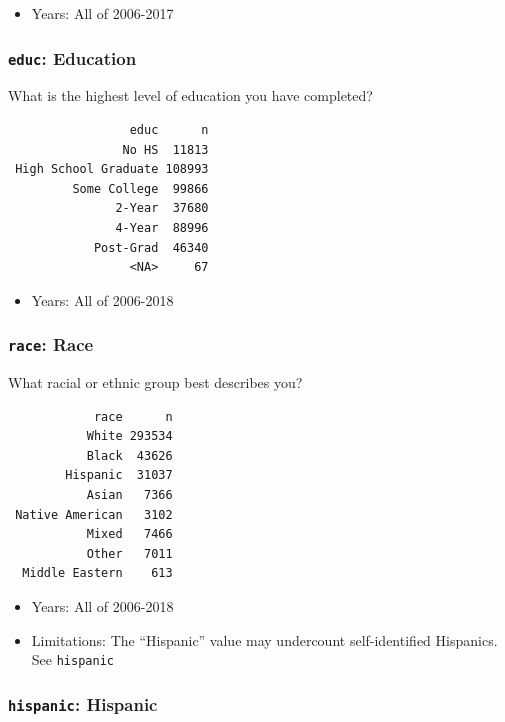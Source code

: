 \documentclass[10pt,article,oneside]{memoir}
\theoremstyle{definition}
\begin{document}
\begin{itemize}
\tightlist
\item
  Years: All of 2006-2017
\end{itemize}

\hypertarget{educ-education}{%
\subsubsection{\texorpdfstring{\texttt{educ}:
Education}{educ: Education}}\label{educ-education}}

What is the highest level of education you have completed?

\begin{verbatim}
                 educ      n
                No HS  11813
 High School Graduate 108993
         Some College  99866
               2-Year  37680
               4-Year  88996
            Post-Grad  46340
                 <NA>     67
\end{verbatim}

\begin{itemize}
\tightlist
\item
  Years: All of 2006-2018
\end{itemize}

\hypertarget{race-race}{%
\subsubsection{\texorpdfstring{\texttt{race}:
Race}{race: Race}}\label{race-race}}

What racial or ethnic group best describes you?

\begin{verbatim}
            race      n
           White 293534
           Black  43626
        Hispanic  31037
           Asian   7366
 Native American   3102
           Mixed   7466
           Other   7011
  Middle Eastern    613
\end{verbatim}

\begin{itemize}
\tightlist
\item
  Years: All of 2006-2018
\item
  Limitations: The ``Hispanic'' value may undercount self-identified
  Hispanics. See \texttt{hispanic}
\end{itemize}

\hypertarget{hispanic-hispanic}{%
\subsubsection{\texorpdfstring{\texttt{hispanic}:
Hispanic}{hispanic: Hispanic}}\label{hispanic-hispanic}}
\end{document}
